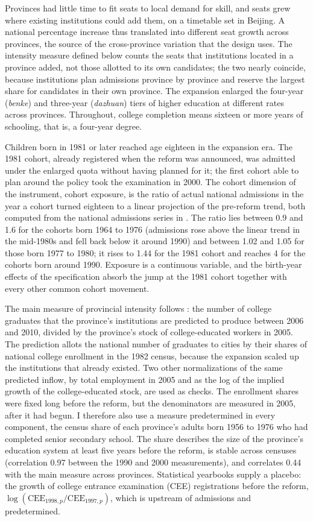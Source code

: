 \documentclass[11pt]{article}
\begin{document}
Provinces had little time to fit seats to local demand for skill, and seats grew where existing institutions could add them, on a timetable set in Beijing. A national percentage increase thus translated into different seat growth across provinces, the source of the cross-province variation that the design uses. The intensity measure defined below counts the seats that institutions located in a province added, not those allotted to its own candidates; the two nearly coincide, because institutions plan admissions province by province and reserve the largest share for candidates in their own province. The expansion enlarged the four-year (\emph{benke}) and three-year (\emph{dazhuan}) tiers of higher education at different rates across provinces. Throughout, college completion means sixteen or more years of schooling, that is, a four-year degree.

Children born in 1981 or later reached age eighteen in the expansion
era. The 1981 cohort, already registered when the reform was announced, was admitted under the enlarged quota without having planned for it; the first cohort able to plan around the policy took
the examination in 2000. The cohort dimension of the instrument, cohort exposure, is the ratio of actual national admissions in the year a cohort turned
eighteen to a linear projection of the pre-reform trend, both computed from the national admissions series in \citet{Ma2024IER}. The ratio lies between 0.9 and 1.6 for the cohorts born 1964 to 1976 (admissions rose above the linear trend in the mid-1980s and fell back below it around 1990) and between 1.02 and 1.05 for those born 1977 to 1980; it rises to 1.44 for the 1981 cohort and reaches 4 for the cohorts born around 1990. Exposure is a continuous variable, and the birth-year effects of the specification absorb the jump at the 1981 cohort together with every other common cohort movement.

The main measure of provincial intensity follows \citet{Ma2024IER}: the number of college graduates that the province's institutions are predicted to produce between 2006 and 2010, divided by the province's
stock of college-educated workers in 2005. The prediction allots the national number of graduates to cities by their shares of national college enrollment in the 1982 census, because the expansion scaled up the institutions that already existed. Two other normalizations of the same predicted inflow, by total employment in 2005 and as the log of the implied growth of the college-educated stock, are used as checks.
The enrollment shares were fixed long before the reform, but the denominators are measured in 2005, after it had begun. I therefore also use a measure predetermined in every component, the census share of each province's
adults born 1956 to 1976 who had completed senior secondary school. The share describes the size of the province's education system at least five years before the reform, is stable
across censuses (correlation 0.97 between the 1990 and 2000
measurements), and correlates 0.44 with the main measure across provinces. Statistical yearbooks supply a placebo: the growth of college entrance examination (CEE) registrations before the reform,
$\log(\mathrm{CEE}_{1998,p} / \mathrm{CEE}_{1997,p})$, which is upstream of admissions and predetermined.
\end{document}
